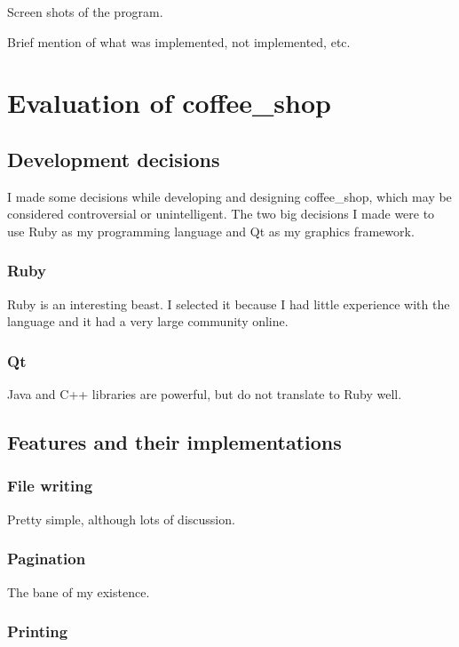 \documentclass[11pt]{article}
\begin{document}
Screen shots of the program.

Brief mention of what was implemented, not implemented, etc.

\section{Evaluation of coffee\_shop}

\subsection{Development decisions}

I made some decisions while developing and designing coffee\_shop, which may be considered controversial or unintelligent. The two big decisions I made were to use Ruby as my programming language and Qt as my graphics framework.

\subsubsection{Ruby}

Ruby is an interesting beast. I selected it because I had little experience with the language and it had a very large community online.

\subsubsection{Qt}

Java and C++ libraries are powerful, but do not translate to Ruby well.

\subsection{Features and their implementations}

\subsubsection{File writing}

Pretty simple, although lots of discussion.

\subsubsection{Pagination}

The bane of my existence.

\subsubsection{Printing}
\end{document}
